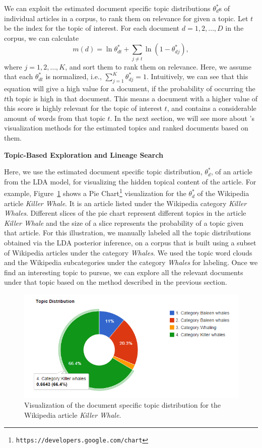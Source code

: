 We can exploit the estimated document specific topic distributions 
$\theta_d^{*}$s of individual articles in a corpus, to rank them on 
relevance for given a topic. Let $t$ be the index for the topic of 
interest. For each document $d = 1, 2, \ldots, D$ in the corpus, we 
can calculate~\cite{George2012}
\begin{equation}
m(d) = \ln \theta^*_{dt} + \sum_{j \neq t}{\ln (1 - \theta^*_{dj})},
\end{equation} 
where $j = 1, 2, \ldots, K$, and sort them to rank them on relevance. 
Here, we assume that each $\theta^*_{dt}$ is normalized, i.e., 
$\sum_{j=1}^{K}{\theta^*_{dj}} = 1$. Intuitively, we can see that 
this equation will give a high value for a document, if the 
probability of occurring the $t$th topic is high in that document. 
This means a document with a higher value of this score is highly 
relevant for the topic of interest $t$, and contains a considerable 
amount of words from that topic $t$. In the next section, we will 
see more about \system's visualization methods for the estimated 
topics and ranked documents based on them.      


\noindent\textbf{Topic-Based Exploration and Lineage Search}

Here, we use the estimated document specific topic distribution, 
$\theta^*_{d}$, of an article from the LDA model, for visualizing 
the hidden topical content of the article. For example, Figure~\ref{fig:doc-topic-distribution} shows a Pie 
Chart\footnote{\texttt{https://developers.google.com/chart}} 
visualization for 
the $\theta^*_{d}$ of the Wikipedia article \textit{Killer Whale}.
It is an article listed under the Wikipedia category          
\textit{Killer Whales}. Different slices of the pie chart represent
different topics in the article \textit{Killer Whale} and the size 
of a slice represents the probability of a topic given that article. 
For this illustration, we manually labeled all the topic 
distributions obtained via the LDA posterior inference, on a 
corpus that is built using a subset of Wikipedia articles under the 
category \textit{Whales}. We used the topic word clouds 
and the Wikipedia subcategories under the category \textit{Whales} 
for labeling. Once we find an interesting topic to pursue, we can 
explore all the relevant documents under that topic based on the 
method described in the previous section. 

\begin{figure}[htb]\centering 
\includegraphics[width=.45\textwidth]{images/doc_topic_distribution.png}
\caption{Visualization of the document specific topic distribution 
for the Wikipedia article \textit{Killer Whale}.}
\label{fig:doc-topic-distribution}
\end{figure}


